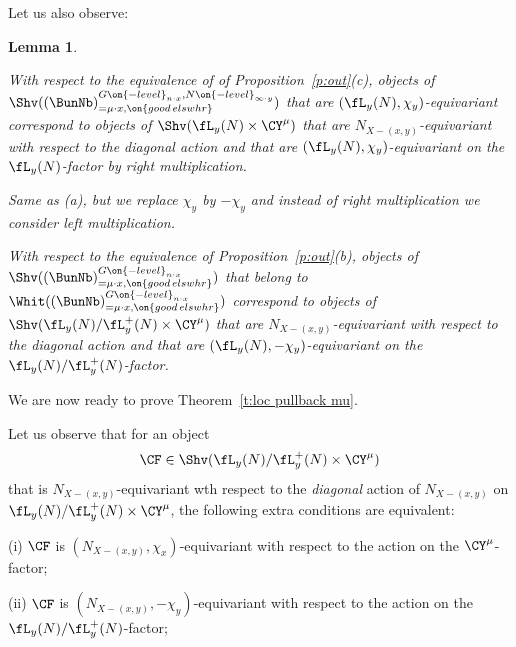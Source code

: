 \documentclass[9pt]{amsart}
\newtheorem{lem}[subsubsection]{Lemma}
\theoremstyle{definition}
\theoremstyle{remark}
\newcommand{\thmref}[1]{Theorem~\ref{#1}}
\newcommand{\propref}[1]{Proposition~\ref{#1}}
\numberwithin{equation}{section}
\begin{document}
Let us also observe: 

\begin{lem} \label{l:out bis} \hfill

\smallskip

 With respect to the equivalence of of \propref{p:out}(c),
objects of $\Shv((\BunNb)^{G\on{-level}_{n\cdot x},N\on{-level}_{\infty\cdot y}}_{=\mu\cdot x,\on{good\,elswhr}})$
that are $(\fL_y(N),\chi_y)$-equivariant correspond to objects of $\Shv(\fL_y(N)\times \CY^\mu)$ that are $N_{X-(x,y)}$-equivariant 
with respect to the diagonal action \emph{and} that are $(\fL_y(N),\chi_y)$-equivariant on the $\fL_y(N)$-factor by \emph{right}
multiplication.

\smallskip

 Same as {\em(a)}, but we replace $\chi_y$ by $-\chi_y$ and instead of right multiplication we consider
left multiplication. 

\smallskip

 With respect to the equivalence of 
\propref{p:out}(b), objects of $\Shv((\BunNb)^{G\on{-level}_{n\cdot x}}_{=\mu\cdot x,\on{good\,elswhr}})$
that belong to $\Whit((\BunNb)^{G\on{-level}_{n\cdot x}}_{=\mu\cdot x,\on{good\,elswhr}})$ correspond to objects of 
$\Shv(\fL_y(N)/\fL^+_y(N)\times \CY^\mu)$ that are $N_{X-(x,y)}$-equivariant with respect to the diagonal action \emph{and} 
that are $(\fL_y(N),-\chi_y)$-equivariant on the $\fL_y(N)/\fL^+_y(N)$-factor. 

\end{lem}

\sssec{}

We are now ready to prove \thmref{t:loc pullback mu}. 

\medskip

Let us observe that for an object 
$$\CF\in \Shv(\fL_y(N)/\fL^+_y(N)\times \CY^\mu)$$ that is 
$N_{X-(x,y)}$-equivariant wth respect to the \emph{diagonal} action of $N_{X-(x,y)}$ on $\fL_y(N)/\fL^+_y(N)\times \CY^\mu$,
the following extra conditions are equivalent:

\smallskip

\noindent(i) $\CF$ is $(N_{X-(x,y)},\chi_x)$-equivariant with respect to the action on the $\CY^\mu$-factor;

\smallskip

\noindent(ii) $\CF$ is $(N_{X-(x,y)},-\chi_y)$-equivariant with respect to the action on the $\fL_y(N)/\fL^+_y(N)$-factor;

\smallskip
\end{document}
